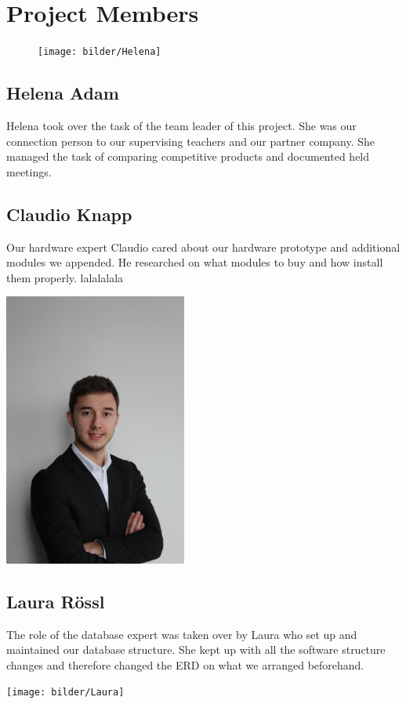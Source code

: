 \chapter*{Project Members}
\begin{figure}
    \texttt{[image: bilder/Helena]}
\end{figure}
\section*{Helena Adam}
Helena took over the task of the team leader of this project. She was our connection person to our supervising teachers and our partner company. She managed the task of comparing competitive products and documented held meetings.
\section*{Claudio Knapp}
Our hardware expert Claudio cared about our hardware prototype and additional modules we appended. He researched on what modules to buy and how install them properly. lalalalala
\begin{center}
\includegraphics[width=0.45\textwidth, angle =-90]{bilder/Claudio}
\end{center}
\section*{Laura Rössl}
The role of the database expert was taken over by Laura who set up and maintained our database structure. She kept up with all the software structure changes and therefore changed the ERD on what we arranged beforehand. 
\begin{center}
\texttt{[image: bilder/Laura]}
\end{center}
